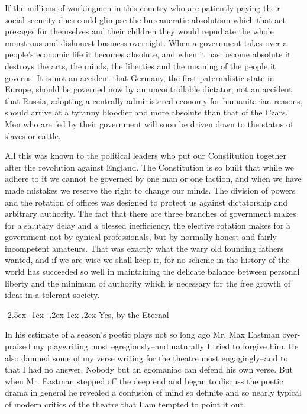 \documentclass[9pt,twoside]{extarticle}
\makeatletter
\renewcommand\section{\@startsection{section}{1}{\z@}%
  {-2.5ex \@plus -1ex \@minus -.2ex}%
  {1ex \@plus .2ex}%
  {\itshape\normalsize}}
\makeatother
\begin{document}
If the millions of workingmen in this country who are patiently paying their social security dues could glimpse the bureaucratic absolutism which that act presages for themselves and their children they would repudiate the whole monstrous and dishonest business overnight. When a government takes over a people's economic life it becomes absolute, and when it has become absolute it destroys the arts, the minds, the liberties and the meaning of the people it governs. It is not an accident that Germany, the first paternalistic state in Europe, should be governed now by an uncontrollable dictator; not an accident that Russia, adopting a centrally administered economy for humanitarian reasons, should arrive at a tyranny bloodier and more absolute than that of the Czars. Men who are fed by their government will soon be driven down to the status of slaves or cattle.

All this was known to the political leaders who put our Constitution together after the revolution against England. The Constitution is so built that while we adhere to it we cannot be governed by one man or one faction, and when we have made mistakes we reserve the right to change our minds. The division of powers and the rotation of offices was designed to protect us against dictatorship and arbitrary authority. The fact that there are three branches of government makes for a salutary delay and a blessed inefficiency, the elective rotation makes for a government not by cynical professionals, but by normally honest and fairly incompetent amateurs. That was exactly what the wary old founding fathers wanted, and if we are wise we shall keep it, for no scheme in the history of the world has succeeded so well in maintaining the delicate balance between personal liberty and the minimum of authority which is necessary for the free growth of ideas in a tolerant society.

\newpage
\section{Yes, by the Eternal}

In his estimate of a season's poetic plays not so long ago Mr. Max Eastman over-praised my playwriting most egregiously--and naturally I tried to forgive him. He also damned some of my verse writing for the theatre most engagingly--and to that I had no answer. Nobody but an egomaniac can defend his own verse. But when Mr. Eastman stepped off the deep end and began to discuss the poetic drama in general he revealed a confusion of mind so definite and so nearly typical of modern critics of the theatre that I am tempted to point it out.
\end{document}
